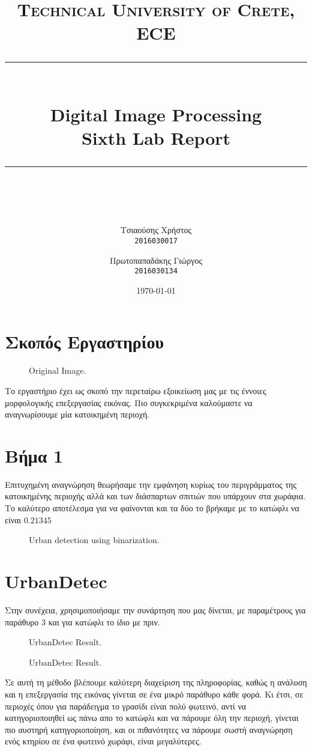 \documentclass[11pt]{scrartcl} %
\title{
	\normalfont\normalsize
	\textsc{Technical University of Crete, ECE}\\ %
	\vspace{25pt} %
	\rule{\linewidth}{0.5pt}\\ %
	\vspace{20pt} %
	{\Huge Digital Image Processing}\\ %

	{\huge Sixth Lab Report}\\ %
	\vspace{12pt} %
	\rule{\linewidth}{2pt}\\ %
	\vspace{12pt} %
}
\author{\LARGE{Τσιαούσης Χρήστος}\\
		\texttt{2016030017}
		\and
		\LARGE{Πρωτοπαπαδάκης Γιώργος}\\
		\texttt{2016030134}}%
\date{\normalsize\today} %
\begin{document}
\maketitle %

\section{Σκοπός Εργαστηρίου}

\begin{figure}[h]
    \centering
    \caption{Original Image.}
\end{figure}

Το εργαστήριο έχει ως σκοπό την περεταίρω εξοικείωση μας με τις έννοιες μορφολογικής επεξεργασίας εικόνας. Πιο συγκεκριμένα καλούμαστε
να αναγνωρίσουμε μία κατοικημένη περιοχή.

\section{Βήμα 1}
Επιτυχημένη αναγνώρηση θεωρήσαμε την εμφάνηση κυρίως του περιγράμματος της κατοικημένης περιοχής αλλά και των διάσπαρτων σπιτιών
που υπάρχουν στα χωράφια. Το καλύτερο αποτέλεσμα για να φαίνονται και τα δύο το βρήκαμε με το κατώφλι να είναι $0.21345$

\begin{figure}[h]
    \centering
    \caption{Urban detection using binarization.}
\end{figure}
\clearpage

\section{UrbanDetec}
Στην συνέχεια, χρησιμοποιήσαμε την συνάρτηση που μας δίνεται, με παραμέτρους για παράθυρο 3 και για κατώφλι το ίδιο με πριν.

\begin{figure}[h]
    \centering
    \caption{UrbanDetec Result.}
\end{figure}
\begin{figure}[h]
    \centering
    \caption{UrbanDetec Result.}
\end{figure}

Σε αυτή τη μέθοδο βλέπουμε καλύτερη διαχείριση της πληροφορίας, καθώς η ανάλυση και η επεξεργασία της εικόνας γίνεται σε ένα μικρό παράθυρο
κάθε φορά. Κι έτσι, σε περιοχές όπου για παράδειγμα το γρασίδι είναι πολύ φωτεινό, αντί να κατηγοριοποιηθεί ως πάνω απο το κατώφλι και να
πάρουμε όλη την περιοχή, γίνεται πιο αυστηρή κατηγοριοποίηση, και οι πιθανότητες να πάρουμε σωστή αναγνώρηση ενός κτηρίου σε ένα φωτεινό χωράφι, είναι
μεγαλύτερες.
\clearpage
\end{document}

